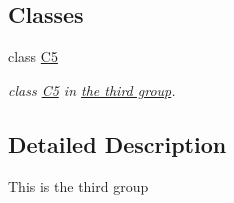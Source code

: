 \subsection*{Classes}
\begin{DoxyCompactItemize}
\item 
class \hyperlink{classC5}{C5}
\begin{DoxyCompactList}\small\item\em class \hyperlink{classC5}{C5} in \hyperlink{group__group3}{the third group}. \end{DoxyCompactList}\end{DoxyCompactItemize}


\subsection{Detailed Description}
This is the third group 
